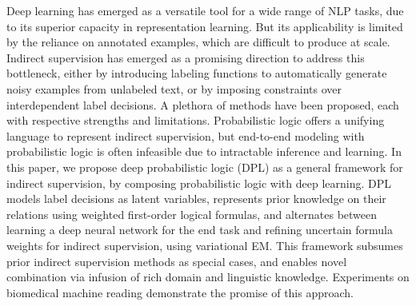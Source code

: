 Deep learning has emerged as a versatile tool for a wide range of NLP tasks, due to its superior capacity in representation learning. But its applicability is limited by the reliance on annotated examples, which are difficult to produce at scale. Indirect supervision has emerged as a promising direction to address this bottleneck, either by introducing labeling functions to automatically generate noisy examples from unlabeled text, or by imposing constraints over interdependent label decisions. A plethora of methods have been proposed, each with respective strengths and limitations. Probabilistic logic offers a unifying language to represent indirect supervision, but end-to-end modeling with probabilistic logic is often infeasible due to intractable inference and learning. In this paper, we propose deep probabilistic logic (DPL) as a general framework for indirect supervision, by composing probabilistic logic with deep learning. DPL models label decisions as latent variables, represents prior knowledge on their relations using weighted first-order logical formulas, and alternates between learning a deep neural network for the end task and refining uncertain formula weights for indirect supervision, using variational EM. This framework subsumes prior indirect supervision methods as special cases, and enables novel combination via infusion of rich domain and linguistic knowledge. Experiments on biomedical machine reading demonstrate the promise of this approach.
